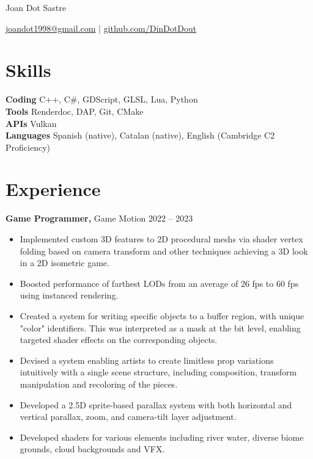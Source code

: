 \documentclass[10pt]{article}       %
\begin{document}
\centerline{\Huge Joan Dot Sastre}

\vspace{5pt}

\centerline{\href{mailto:joandot1998@gmail.com}{joandot1998@gmail.com} | \href{https://github.com/DinDotDout}{github.com/DinDotDout}}

\vspace{-10pt}

\section*{Skills}
\textbf{Coding} C++, C\#, GDScript, GLSL, Lua, Python \\
\textbf{Tools} Renderdoc, DAP, Git, CMake \\
\textbf{APIs} Vulkan \\
\textbf{Languages} Spanish (native), Catalan (native), English (Cambridge C2 Proficiency)

\vspace{-6.5pt}

\section*{Experience}
\textbf{Game Programmer,} {Game Motion} \hfill 2022 -- 2023\\
\vspace{-9pt}
\begin{itemize}
	\item Implemented custom 3D features to 2D procedural meshs via shader vertex folding based
        on camera transform and other techniques achieving a 3D look in a 2D isometric game.
	\item Boosted performance of farthest LODs from an average of 26 fps to 60 fps using instanced rendering.
	\item Created a system for writing specific objects to a buffer region, with
        unique "color" identifiers. This was interpreted as a mask at the bit level,
        enabling targeted shader effects on the corresponding objects.
	\item Devised a system enabling artists to create limitless prop variations intuitively with
        a single scene structure, including composition, transform manipulation and recoloring of the pieces.
	\item Developed a 2.5D sprite-based parallax system with both horizontal and vertical
        parallax, zoom, and camera-tilt layer adjustment.
	\item Developed shaders for various elements including river water, diverse biome grounds, cloud backgrounds and VFX.

\end{itemize}
\end{document}
